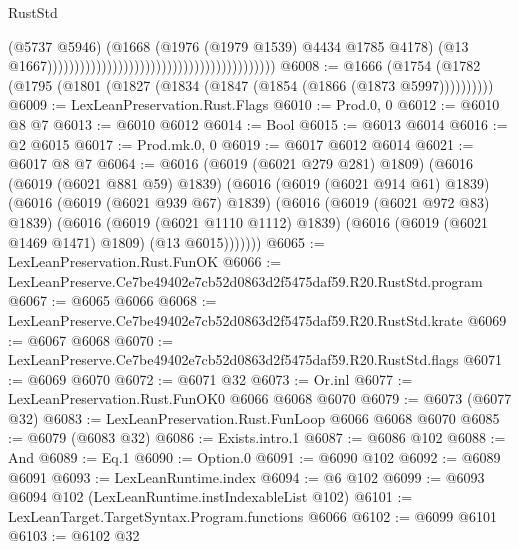 \begin{lexlean}{RustStd}
\begin{coremodule}
                                                                                    (@5737 @5946)
                                                                                    (@1668
                                                                                      (@1976
                                                                                        (@1979
                                                                                          @1539)
                                                                                        @4434
                                                                                        @1785
                                                                                        @4178)
                                                                                      (@13
                                                                                        @1667))))))))))))))))))))))))))))))))))))))))))
@6008 := @1666 (@1754 (@1782 (@1795 (@1801 (@1827 (@1834 (@1847 (@1854 (@1866 (@1873 @5997))))))))))
@6009 := LexLeanPreservation.Rust.Flags
@6010 := Prod.{0, 0}
@6012 := @6010 @8 @7
@6013 := @6010 @6012
@6014 := Bool
@6015 := @6013 @6014
@6016 := @2 @6015
@6017 := Prod.mk.{0, 0}
@6019 := @6017 @6012 @6014
@6021 := @6017 @8 @7
@6064 := @6016
    (@6019 (@6021 @279 @281) @1809)
    (@6016
      (@6019 (@6021 @881 @59) @1839)
      (@6016
        (@6019 (@6021 @914 @61) @1839)
        (@6016
          (@6019 (@6021 @939 @67) @1839)
          (@6016
            (@6019 (@6021 @972 @83) @1839)
            (@6016
              (@6019 (@6021 @1110 @1112) @1839)
              (@6016 (@6019 (@6021 @1469 @1471) @1809) (@13 @6015)))))))
@6065 := LexLeanPreservation.Rust.FunOK
@6066 := LexLeanPreserve.Ce7be49402e7cb52d0863d2f5475daf59.R20.RustStd.program
@6067 := @6065 @6066
@6068 := LexLeanPreserve.Ce7be49402e7cb52d0863d2f5475daf59.R20.RustStd.krate
@6069 := @6067 @6068
@6070 := LexLeanPreserve.Ce7be49402e7cb52d0863d2f5475daf59.R20.RustStd.flags
@6071 := @6069 @6070
@6072 := @6071 @32
@6073 := Or.inl
@6077 := LexLeanPreservation.Rust.FunOK0 @6066 @6068 @6070
@6079 := @6073 (@6077 @32)
@6083 := LexLeanPreservation.Rust.FunLoop @6066 @6068 @6070
@6085 := @6079 (@6083 @32)
@6086 := Exists.intro.{1}
@6087 := @6086 @102
@6088 := And
@6089 := Eq.{1}
@6090 := Option.{0}
@6091 := @6090 @102
@6092 := @6089 @6091
@6093 := LexLeanRuntime.index
@6094 := @6 @102
@6099 := @6093 @6094 @102 (LexLeanRuntime.instIndexableList @102)
@6101 := LexLeanTarget.TargetSyntax.Program.functions @6066
@6102 := @6099 @6101
@6103 := @6102 @32

\end{coremodule}
\end{lexlean}
